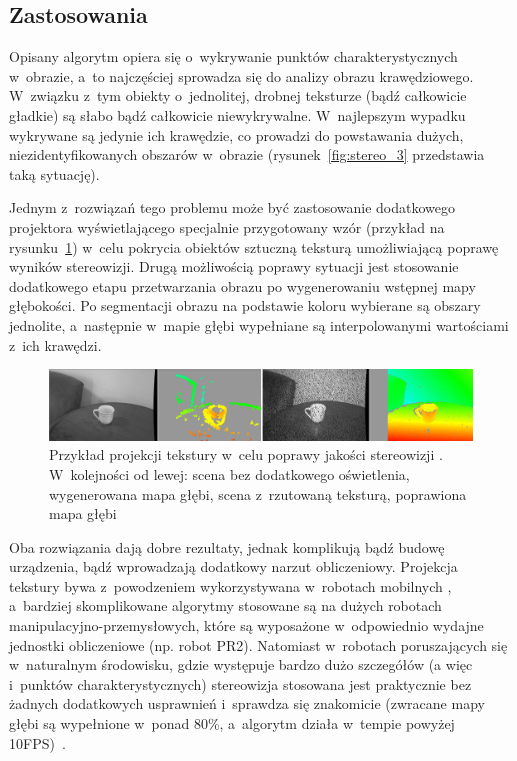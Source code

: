 \subsection{Zastosowania}

Opisany algorytm opiera się o~wykrywanie punktów charakterystycznych w~obrazie, a~to
najczęściej sprowadza się do analizy obrazu krawędziowego. W~związku z~tym
obiekty o~jednolitej, drobnej teksturze (bądź całkowicie gładkie) są słabo bądź
całkowicie niewykrywalne. W~najlepszym wypadku wykrywane są jedynie ich
krawędzie, co prowadzi do powstawania dużych, niezidentyfikowanych obszarów 
w~obrazie (rysunek~\ref{fig:stereo_3} przedstawia taką sytuację).

Jednym z~rozwiązań tego problemu może być zastosowanie dodatkowego projektora
wyświetlającego specjalnie przygotowany wzór (przykład na
rysunku~\ref{fig:stereo_texture}) w~celu pokrycia obiektów sztuczną teksturą
umożliwiającą poprawę wyników stereowizji. Drugą możliwością poprawy sytuacji
jest stosowanie dodatkowego etapu przetwarzania obrazu po wygenerowaniu
wstępnej mapy głębokości. Po segmentacji obrazu na podstawie koloru wybierane
są obszary jednolite, a~następnie w~mapie głębi wypełniane są interpolowanymi
wartościami z~ich krawędzi.

\begin{figure}[htpb!]
\centering
\includegraphics[width=16cm]{../../Common/img/stereo_texture}
\caption[Przykład projekcji tekstury w~celu poprawy jakości
stereowizji]{Przykład projekcji tekstury w~celu poprawy jakości stereowizji
\cite{konolige-icra-2010-a}. W~kolejności od lewej: scena bez dodatkowego
oświetlenia, wygenerowana mapa głębi, scena z~rzutowaną teksturą, poprawiona
mapa głębi}
\label{fig:stereo_texture}
\end{figure}

Oba rozwiązania dają dobre rezultaty, jednak komplikują bądź budowę urządzenia,
bądź wprowadzają dodatkowy narzut obliczeniowy. Projekcja tekstury bywa
z~powodzeniem wykorzystywana w~robotach mobilnych \cite{piorkowski2008}, 
a~bardziej skomplikowane algorytmy stosowane są na dużych robotach
manipulacyjno-przemysłowych, które są wyposażone w~odpowiednio wydajne
jednostki obliczeniowe (np. robot PR2). Natomiast w~robotach poruszających się
w~naturalnym środowisku, gdzie występuje bardzo dużo szczegółów (a więc 
i~punktów charakterystycznych) stereowizja stosowana jest praktycznie bez żadnych
dodatkowych usprawnień i~sprawdza się znakomicie (zwracane mapy głębi są
wypełnione w~ponad 80\%, a~algorytm działa w~tempie powyżej 10FPS)~\cite{outdoor-stereo}.


